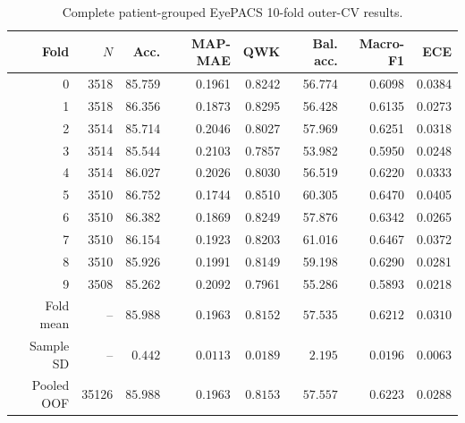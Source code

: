 \documentclass[10pt,twocolumn,letterpaper]{article}
\begin{document}
\begin{table}[t]
  \centering
  \caption{Complete patient-grouped EyePACS 10-fold outer-CV results.}
  \label{tab:eyepacs-folds}
  \small
  \setlength{\tabcolsep}{7pt}
  \begin{tabular}{@{}rrrrrrrr@{}}
    \toprule
    Fold & $N$ & Acc. & MAP-MAE & QWK & Bal. acc. & Macro-F1 & ECE \\
    \midrule
    0 & 3518 & 85.759 & 0.1961 & 0.8242 & 56.774 & 0.6098 & 0.0384 \\
    1 & 3518 & 86.356 & 0.1873 & 0.8295 & 56.428 & 0.6135 & 0.0273 \\
    2 & 3514 & 85.714 & 0.2046 & 0.8027 & 57.969 & 0.6251 & 0.0318 \\
    3 & 3514 & 85.544 & 0.2103 & 0.7857 & 53.982 & 0.5950 & 0.0248 \\
    4 & 3514 & 86.027 & 0.2026 & 0.8030 & 56.519 & 0.6220 & 0.0333 \\
    5 & 3510 & 86.752 & 0.1744 & 0.8510 & 60.305 & 0.6470 & 0.0405 \\
    6 & 3510 & 86.382 & 0.1869 & 0.8249 & 57.876 & 0.6342 & 0.0265 \\
    7 & 3510 & 86.154 & 0.1923 & 0.8203 & 61.016 & 0.6467 & 0.0372 \\
    8 & 3510 & 85.926 & 0.1991 & 0.8149 & 59.198 & 0.6290 & 0.0281 \\
    9 & 3508 & 85.262 & 0.2092 & 0.7961 & 55.286 & 0.5893 & 0.0218 \\
    \midrule
    Fold mean & -- & $85.988$ & $0.1963$ & $0.8152$ & $57.535$ & $0.6212$ & $0.0310$ \\
    Sample SD & -- & $0.442$ & $0.0113$ & $0.0189$ & $2.195$ & $0.0196$ & $0.0063$ \\
    Pooled OOF & 35126 & $85.988$ & $0.1963$ & $0.8153$ & $57.557$ & $0.6223$ & $0.0288$ \\
    \bottomrule
  \end{tabular}
\end{table}
\end{document}
